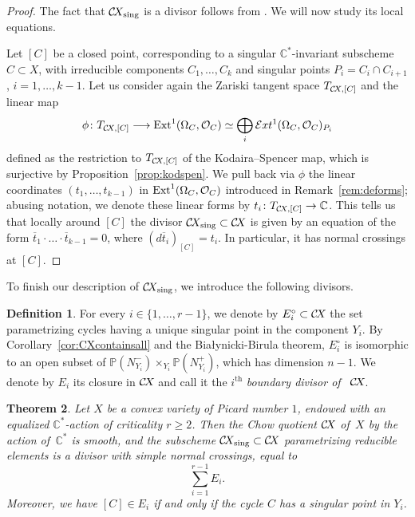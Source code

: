 \documentclass[10pt,a4paper]{article}
\numberwithin{equation}{section}
\newtheorem{theorem}{Theorem}[section]
\theoremstyle{definition}
\newtheorem{definition}[theorem]{Definition}
\theoremstyle{remark}
\def\sing{\operatorname{sing}}
\def\C{{\mathbb C}}
\def\P{{\mathbb P}}
\def\cO{{\mathcal{O}}}
\def\cExt{{\mathcal E}xt}
\def\operatorname#1{\mathop{\rm #1}\nolimits}
\def\Ext{\operatorname{Ext}}
\def\CX{\mathcal{C}\!X\hspace{-0.5pt}}
\def\ol{\overline}
\newcommand\lra{\longrightarrow}
\newcommand{\supth}[1]{\ensuremath{#1^{\mathrm{th}}}}
\begin{document}
\begin{proof}
The fact that $\CX_{\sing}$ is a divisor follows from \cite[Propositions 6.2.11 and 6.3.5]{Talpo}.  We will now study its local equations.

Let $[C]$ be a closed point, corresponding to a singular $\C^*$-invariant subscheme $C\subset X$, with irreducible components $C_1,\dots, C_k$ and singular points $P_i=C_i\cap C_{i+1}$, $i=1,\dots,k-1$. Let us  consider again the Zariski tangent space $T_{\CX,[C]}$ and the linear map
$$
\phi\colon T_{\CX,[C]}\lra \Ext^1(\Omega_C,\cO_C)\simeq \bigoplus_i\cExt^1(\Omega_C,\cO_C)_{P_i}
$$ 
defined as the restriction to $T_{\CX,[C]}$ of the Kodaira--Spencer map, which is surjective by Proposition~\ref{prop:kodspen}. We pull back via $\phi$ the linear coordinates $(t_1,\dots, t_{k-1})$ in  $\Ext^1(\Omega_C,\cO_C)$ introduced in Remark~\ref{rem:deforms}; abusing notation, we denote these linear forms by $t_i\colon T_{\CX,[C]}\to\C$.  This tells us that locally around $[C]$ the divisor $\CX_{\sing}\subset\CX$ is given by an equation of the form $\ol{t}_1\cdot\ldots \cdot \ol{t}_{k-1}=0$, where $(d\ol{t}_i)_{[C]}=t_i$.  In particular, it has normal crossings at $[C]$. 
\end{proof}

To finish our description of $\CX_{\sing}$,  we introduce the following divisors.  

\begin{definition}\label{def:Ei}
For  every $i\in \{1,\dots,r-1\}$, we denote by $E^\circ_i\subset\CX$ the set parametrizing cycles having a unique singular point in the component $Y_i$. By Corollary~\ref{cor:CXcontainsall} and the Bia{\l}ynicki-Birula theorem, $E^\circ_i$ is isomorphic to an open subset of $\P(N_{Y_i}^-)\times_{Y_i}\P(N_{Y_i}^+)$, which has dimension $n-1$. We denote by $E_i$ its closure in $\CX$ and call it the $\supth{i}$ {\em boundary divisor of }\, $\CX$. 
\end{definition}


\begin{theorem}\label{thm:smoothborder} 
Let $X$ be a convex variety of Picard number $1$, endowed with an equalized $\C^*$-action of criticality $r\geq 2$. Then the Chow quotient $\CX$ of\, $X$ by the action of\, $\C^*$ is smooth, and the subscheme $\CX_{\sing}\subset\CX$ parametrizing reducible elements is a divisor with simple normal crossings, equal to
$$\sum_{i=1}^{r-1}E_i.$$
Moreover, we have $[C] \in E_i$ if and only if the cycle $C$ has a singular point in $Y_i$. 
\end{theorem}
\end{document}
